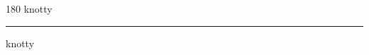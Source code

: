 
\begin{frame}
\begin{center}
\begin{turn}{180}
{\fontsize{2.5cm}{1em}\selectfont knotty}
\end{turn}
\vspace{1em}\par  
\hrule
\vspace{1em}\par  
{\fontsize{2.5cm}{1em}\selectfont knotty}
\end{center}
\end{frame}
